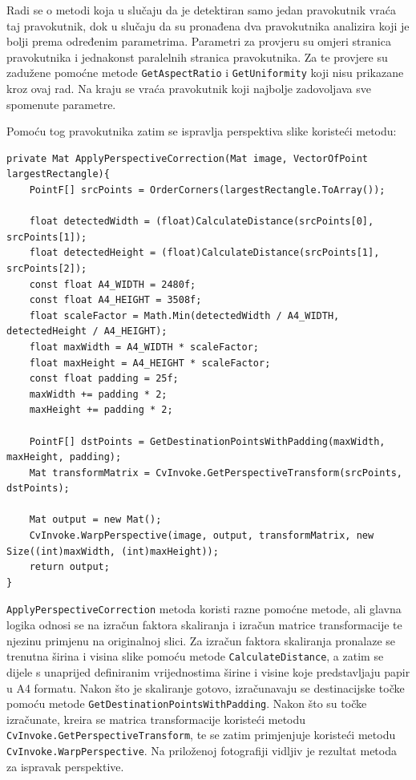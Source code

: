 \documentclass{foi}
\begin{document}
Radi se o metodi koja u slučaju da je detektiran samo jedan pravokutnik vraća taj pravokutnik, dok u slučaju da su pronađena dva pravokutnika analizira koji je bolji prema određenim parametrima. Parametri za provjeru su omjeri stranica pravokutnika i jednakonst paralelnih stranica pravokutnika. Za te provjere su zadužene pomoćne metode \texttt{GetAspectRatio} i \texttt{GetUniformity} koji nisu prikazane kroz ovaj rad. Na kraju se vraća pravokutnik koji najbolje zadovoljava sve spomenute parametre.

\pagebreak
Pomoću tog pravokutnika zatim se ispravlja perspektiva slike koristeći metodu:
\begin{lstlisting}[caption={Metoda za odabir najboljeg pravokutnika}]
private Mat ApplyPerspectiveCorrection(Mat image, VectorOfPoint largestRectangle){
    PointF[] srcPoints = OrderCorners(largestRectangle.ToArray());

    float detectedWidth = (float)CalculateDistance(srcPoints[0], srcPoints[1]);
    float detectedHeight = (float)CalculateDistance(srcPoints[1], srcPoints[2]);
    const float A4_WIDTH = 2480f;
    const float A4_HEIGHT = 3508f;
    float scaleFactor = Math.Min(detectedWidth / A4_WIDTH, detectedHeight / A4_HEIGHT);
    float maxWidth = A4_WIDTH * scaleFactor;
    float maxHeight = A4_HEIGHT * scaleFactor;
    const float padding = 25f;
    maxWidth += padding * 2;
    maxHeight += padding * 2;

    PointF[] dstPoints = GetDestinationPointsWithPadding(maxWidth, maxHeight, padding);
    Mat transformMatrix = CvInvoke.GetPerspectiveTransform(srcPoints, dstPoints);

    Mat output = new Mat();
    CvInvoke.WarpPerspective(image, output, transformMatrix, new Size((int)maxWidth, (int)maxHeight));
    return output;
}
\end{lstlisting}

\texttt{ApplyPerspectiveCorrection} metoda koristi razne pomoćne metode, ali glavna logika odnosi se na izračun faktora skaliranja i izračun matrice transformacije te njezinu primjenu na originalnoj slici. Za izračun faktora skaliranja pronalaze se trenutna širina i visina slike pomoću metode \texttt{CalculateDistance}, a zatim se dijele s unaprijed definiranim vrijednostima širine i visine koje predstavljaju papir u A4 formatu. Nakon što je skaliranje gotovo, izračunavaju se destinacijske točke pomoću metode \texttt{GetDestinationPointsWithPadding}. Nakon što su točke izračunate, kreira se matrica transformacije koristeći metodu \texttt{CvInvoke.GetPerspectiveTransform}, te se zatim primjenjuje koristeći metodu \texttt{CvInvoke.WarpPerspective}. Na priloženoj fotografiji vidljiv je rezultat metoda za ispravak perspektive.
\end{document}
